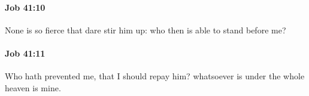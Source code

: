 		\paragraph{Job 41:10} %
			\label{JOB-41-10}

			None is so fierce that dare stir him up: who then is able to stand before me?


		\paragraph{Job 41:11} %
			\label{JOB-41-11}

			Who hath prevented me, that I should repay him? whatsoever is under the whole heaven is mine.


